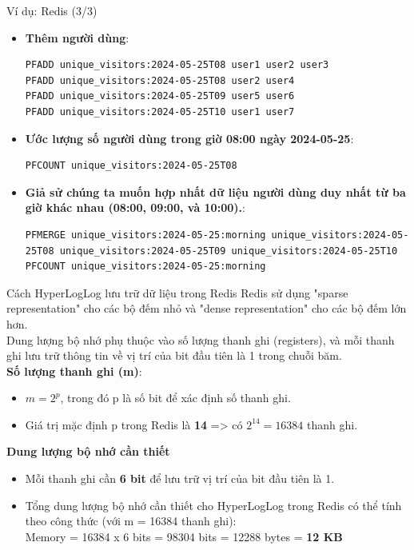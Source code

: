 \documentclass[10pt]{beamer}
\begin{document}
\begin{frame}[fragile]{Ví dụ: Redis (3/3)}
\begin{itemize}
	\item \textbf{Thêm người dùng}:
	\begin{lstlisting}
PFADD unique_visitors:2024-05-25T08 user1 user2 user3
PFADD unique_visitors:2024-05-25T08 user2 user4
PFADD unique_visitors:2024-05-25T09 user5 user6
PFADD unique_visitors:2024-05-25T10 user1 user7
\end{lstlisting}
\item \textbf{Ước lượng số người dùng trong giờ 08:00 ngày 2024-05-25}:
	\begin{lstlisting}
PFCOUNT unique_visitors:2024-05-25T08
\end{lstlisting}
\item \textbf{Giả sử chúng ta muốn hợp nhất dữ liệu người dùng duy nhất từ ba giờ khác nhau (08:00, 09:00, và 10:00).}:
	\begin{lstlisting}
PFMERGE unique_visitors:2024-05-25:morning unique_visitors:2024-05-25T08 unique_visitors:2024-05-25T09 unique_visitors:2024-05-25T10
PFCOUNT unique_visitors:2024-05-25:morning
\end{lstlisting}
\end{itemize}
\end{frame}

\begin{frame}[fragile]{Cách HyperLogLog lưu trữ dữ liệu trong Redis}
Redis sử dụng "sparse representation" cho các bộ đếm nhỏ và "dense representation" cho các bộ đếm lớn hơn.\\
Dung lượng bộ nhớ phụ thuộc vào số lượng thanh ghi (registers), 
và mỗi thanh ghi lưu trữ thông tin về vị trí của bit đầu tiên là 1 
trong chuỗi băm.\\
\vspace{0.2cm}
\textbf{Số lượng thanh ghi (m)}:
\begin{itemize}
	\item $m = 2^p$, trong đó p là số bit để xác định số thanh ghi.
	\item Giá trị mặc định p trong Redis là \textbf{14} => có $2^{14} = 16384$ thanh ghi.
\end{itemize}
\textbf{Dung lượng bộ nhớ cần thiết}
\begin{itemize}
	\item Mỗi thanh ghi cần \textbf{6 bit} để lưu trữ vị trí của bit đầu tiên là 1.
	\item Tổng dung lượng bộ nhớ cần thiết cho HyperLogLog trong Redis có thể 
  tính theo công thức (với m = 16384 thanh ghi):\\ 
	Memory = 16384 x 6 bits = 98304 bits = 12288 bytes = \textbf{12 KB}
\end{itemize}
\end{frame}
\end{document}
